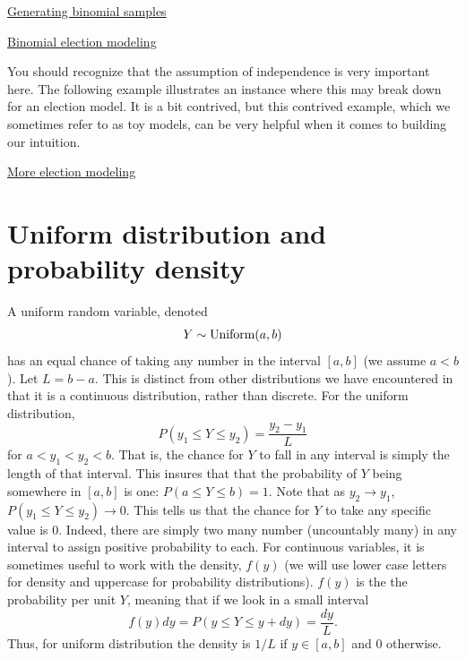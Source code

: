 \begin{exercise}
\href{https://colab.research.google.com/drive/1PPFwE4GUzsr707s3mPhGRs7-TYlHxND2#scrollTo=vAmv5zV7gfE0}{Generating binomial samples}
\end{exercise}

\begin{exercise}
\href{https://colab.research.google.com/drive/1PPFwE4GUzsr707s3mPhGRs7-TYlHxND2#scrollTo=8cRVZNYtLOum}{Binomial election modeling}
\end{exercise}

You should recognize that the assumption of independence is very important here. The following example illustrates an instance where this may break down for an election model. It is a bit contrived, but this contrived example, which we sometimes refer to as {\dfn toy models}, can be very helpful when it comes to building our intuition. 
\begin{exercise}
\href{https://colab.research.google.com/drive/1PPFwE4GUzsr707s3mPhGRs7-TYlHxND2#scrollTo=cwE2yj2nqdYF&line=1&uniqifier=1}{More election modeling}
\end{exercise}

 

 
 
 \section{Uniform distribution and probability density}
 A uniform random variable, denoted  
 \begin{equation}
 Y \sim {\rm Uniform}(a,b)
 \end{equation}
 has an equal chance of taking any number in the interval $[a,b]$ (we assume $a<b$). Let $L=b-a$. This is distinct from other distributions we have encountered in that it is a {\dfn continuous distribution}, rather than discrete. For the uniform distribution, 
 \begin{equation}
 P(y_1\le Y \le y_2) = \frac{y_2-y_1}{L}
 \end{equation}
 for $a<y_1<y_2<b$. 
 That is, the chance for $Y$ to fall in any interval is simply the length of that interval. This insures that that the probability of $Y$ being somewhere in $[a,b]$ is one: $P(a\le Y\le b) = 1$. Note that as $y_2 \to y_1$, $P(y_1\le Y \le y_2) \to 0$. This tells us that the chance for $Y$ to take any specific value is $0$. Indeed, there are simply two many number (uncountably many) in any interval to assign positive probability to each. For continuous variables, it is sometimes useful to work with the density, $f(y)$ (we will use lower case letters for density and uppercase for probability distributions). $f(y)$ is the the probability per unit $Y$, meaning that if we look in a small interval 
 \begin{equation}
f(y)dy = P(y \le Y \le y+dy) = \frac{dy}{L}.
 \end{equation}
 Thus, for uniform distribution the density is $1/L$ if $y \in [a,b]$ and $0$ otherwise. 
 
